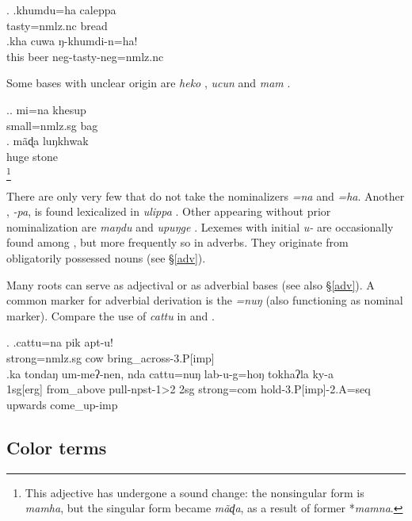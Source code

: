 \ex. \ag.khumdu=ha caleppa\\
tasty{\sc =nmlz.nc} bread\\
\bg.kha cuwa ŋ-khumdi-n=ha!\\
this beer {\sc neg-}tasty{\sc -neg=nmlz.nc}\\

  
Some bases with  unclear origin are \emph{heko} , \emph{ucun}  and \emph{mam} .

\ex.\ag. mi=na khesup\\
small{\sc =nmlz.sg} bag\\
\bg. mãɖa luŋkhwak\\
	huge{\sc [nmlz.sg]} stone\\
	\footnote{This adjective has undergone a sound change: the nonsingular form is \emph{mamha}, but the singular form became \emph{mãɖa}, as a result of former *\emph{mamna}.}

	
There are only very few  that do not take the nominalizers \emph{=na} and \emph{=ha}. Another , \emph{-pa}, is found lexicalized in \emph{ulippa} . Other  appearing without prior nominalization are \emph{maŋdu}  and \emph{upuŋge} . Lexemes with initial \emph{u-} are occasionally found among , but more frequently so in adverbs. They originate from obligatorily possessed nouns (see §\ref{adv}).


	Many roots can serve as adjectival or as adverbial bases (see also  §\ref{adv}). A common marker for adverbial derivation is the  \emph{=nuŋ} (also functioning as nominal  marker). Compare the use of \emph{cattu} in \Next[a] and \Next[b].
	
	\ex. \ag.cattu=na pik apt-u!\\
	strong{\sc =nmlz.sg} cow bring\_across{\sc -3.P[imp]}\\
	\bg.ka       tondaŋ    um-meʔ-nen,       nda cattu=nuŋ    lab-u-g=hoŋ                tokhaʔla ky-a\\
	{\sc 1sg[erg]} from\_above pull{\sc -npst-1>2} {\sc 2sg} strong{\sc =com} hold{\sc -3.P[imp]-2.A=seq} upwards come\_up{\sc -imp}\\
	 

	
\subsection{Color terms}\label{sec-color}

